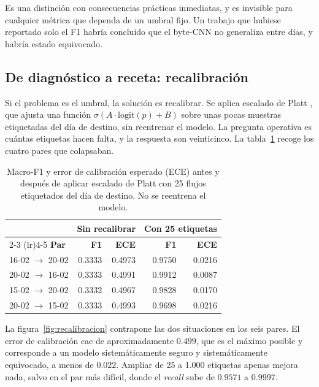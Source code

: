 Es una distinción con consecuencias prácticas inmediatas, y es invisible para
cualquier métrica que dependa de un umbral fijo. Un trabajo que hubiese
reportado solo el F1 habría concluido que el byte-CNN no generaliza entre días,
y habría estado equivocado.

\subsection{De diagnóstico a receta: recalibración}

Si el problema es el umbral, la solución es recalibrar. Se aplica escalado de
Platt \cite{Platt1999}, que ajusta una función
$\sigma(A \cdot \mathrm{logit}(p) + B)$ sobre unas pocas muestras etiquetadas
del día de destino, sin reentrenar el modelo. La pregunta operativa es cuántas
etiquetas hacen falta, y la respuesta son veinticinco. La
tabla~\ref{tab:recalibracion} recoge los cuatro pares que colapsaban.

\begin{table}[htbp]
  \centering
  \caption[Recalibración con 25 etiquetas del día de destino]{Macro-F1 y error
  de calibración esperado (ECE) antes y después de aplicar escalado de Platt con
  25 flujos etiquetados del día de destino. No se reentrena el modelo.}
  \label{tab:recalibracion}
  \begin{tabular}{lrrrr}
    \toprule
    & \multicolumn{2}{c}{\textbf{Sin recalibrar}} & \multicolumn{2}{c}{\textbf{Con 25 etiquetas}} \\
    \cmidrule(lr){2-3} \cmidrule(lr){4-5}
    \textbf{Par} & \textbf{F1} & \textbf{ECE} & \textbf{F1} & \textbf{ECE} \\
    \midrule
    16-02 $\rightarrow$ 20-02 & 0.3333 & 0.4973 & 0.9750 & 0.0216 \\
    20-02 $\rightarrow$ 16-02 & 0.3333 & 0.4991 & 0.9912 & 0.0087 \\
    15-02 $\rightarrow$ 20-02 & 0.3332 & 0.4967 & 0.9828 & 0.0170 \\
    20-02 $\rightarrow$ 15-02 & 0.3333 & 0.4993 & 0.9698 & 0.0216 \\
    \bottomrule
  \end{tabular}
\end{table}

La figura~\ref{fig:recalibracion} contrapone las dos situaciones en los seis
pares. El error de calibración cae de aproximadamente $0.499$,
que es el máximo posible y corresponde a un modelo sistemáticamente seguro y
sistemáticamente equivocado, a menos de $0.022$. Ampliar de 25 a 1.000
etiquetas apenas mejora nada, salvo en el par más difícil, donde el
\emph{recall} sube de $0.9571$ a $0.9997$.

